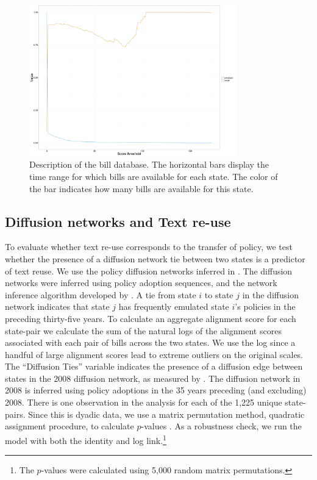 \documentclass[12pt]{article} %
\begin{document}
\begin{figure}[ht!]
    \centering
    \includegraphics[width=0.8\textwidth]{figures/ncsl_prec_rec.png}
    \caption{Description of the bill database. The horizontal bars display the time range for which bills are available for each state. The color of the bar indicates how many bills are available for this state.}
    \label{fig:ncsl_prec_rec}
\end{figure}


\subsection{Diffusion networks and Text re-use}

To evaluate whether text re-use corresponds to the transfer of policy, we test whether the presence of a diffusion network tie between two states is a predictor of text reuse. We use the policy diffusion networks inferred in \citet{desmarais2015}. The diffusion networks were inferred using policy adoption sequences, and the network inference algorithm developed by \citet{gomez2010inferring}. A tie from state $i$ to state $j$ in the diffusion network indicates that state $j$ has frequently emulated state $i$'s policies in the preceding thirty-five years. To calculate an aggregate alignment score for each state-pair we calculate the sum of the natural logs of the alignment scores associated with each pair of bills across the two states. We use the log since a handful of large alignment scores lead to extreme outliers on the original scales. The ``Diffusion Ties'' variable indicates the presence of a diffusion edge between states in the 2008 diffusion network, as measured by \citet{desmarais2015}. The diffusion network in 2008 is inferred using policy adoptions in the 35 years preceding (and excluding) 2008.  There is one observation in the analysis for each of the 1,225 unique state-pairs. Since this is dyadic data, we use a matrix permutation method, quadratic assignment procedure, to calculate $p$-values \citep{krackhardt1988}. As a robustness check, we run the model with both the identity and log link.\footnote{The $p$-values were calculated using 5,000 random matrix permutations.}
\end{document}
